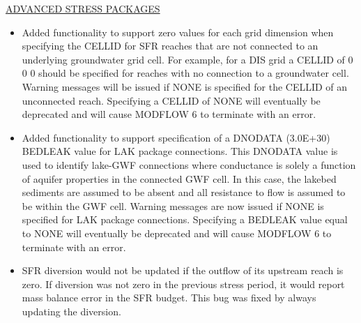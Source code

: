 	\underline{ADVANCED STRESS PACKAGES}
	\begin{itemize}
		\item Added functionality to support zero values for each grid dimension when specifying the CELLID for SFR reaches that are not connected to an underlying groundwater grid cell. For example, for a DIS grid a CELLID of 0 0 0 should be specified for reaches with no connection to a groundwater cell. Warning messages will be issued if NONE is specified for the CELLID of an unconnected reach. Specifying a CELLID of NONE will eventually be deprecated and will cause MODFLOW 6 to terminate with an error.
		\item Added functionality to support specification of a DNODATA (3.0E+30) BEDLEAK value for LAK package connections.  This DNODATA value is used to identify lake-GWF connections where conductance is solely a function of aquifer properties in the connected GWF cell.  In this case, the lakebed sediments are assumed to be absent and all resistance to flow is assumed to be within the GWF cell. Warning messages are now issued if NONE is specified for LAK package connections. Specifying a BEDLEAK value equal to NONE will eventually be deprecated and will cause MODFLOW 6 to terminate with an error.
		\item SFR diversion would not be updated if the outflow of its upstream reach is zero. If diversion was not zero in the previous stress period, it would report mass balance error in the SFR budget. This bug was fixed by always updating the diversion.
	\end{itemize}


